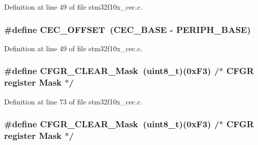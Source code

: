 Definition at line 49 of file stm32f10x\+\_\+cec.\+c.

\subsubsection[{\texorpdfstring{C\+E\+C\+\_\+\+O\+F\+F\+S\+ET}{CEC_OFFSET}}]{\setlength{\rightskip}{0pt plus 5cm}\#define C\+E\+C\+\_\+\+O\+F\+F\+S\+ET~({\bf C\+E\+C\+\_\+\+B\+A\+SE} -\/ {\bf P\+E\+R\+I\+P\+H\+\_\+\+B\+A\+SE})}\hypertarget{group___c_e_c___private___defines_ga675324bd8967b75f32554f50210821af}{}\label{group___c_e_c___private___defines_ga675324bd8967b75f32554f50210821af}


Definition at line 49 of file stm32f10x\+\_\+cec.\+c.

\subsubsection[{\texorpdfstring{C\+F\+G\+R\+\_\+\+C\+L\+E\+A\+R\+\_\+\+Mask}{CFGR_CLEAR_Mask}}]{\setlength{\rightskip}{0pt plus 5cm}\#define C\+F\+G\+R\+\_\+\+C\+L\+E\+A\+R\+\_\+\+Mask~({\bf uint8\+\_\+t})(0x\+F3)        /$\ast$ C\+F\+G\+R register Mask $\ast$/}\hypertarget{group___c_e_c___private___defines_gaaedf9b8df17534f5eaf75ec1ca3fbd7a}{}\label{group___c_e_c___private___defines_gaaedf9b8df17534f5eaf75ec1ca3fbd7a}


Definition at line 73 of file stm32f10x\+\_\+cec.\+c.

\subsubsection[{\texorpdfstring{C\+F\+G\+R\+\_\+\+C\+L\+E\+A\+R\+\_\+\+Mask}{CFGR_CLEAR_Mask}}]{\setlength{\rightskip}{0pt plus 5cm}\#define C\+F\+G\+R\+\_\+\+C\+L\+E\+A\+R\+\_\+\+Mask~({\bf uint8\+\_\+t})(0x\+F3)        /$\ast$ C\+F\+G\+R register Mask $\ast$/}\hypertarget{group___c_e_c___private___defines_gaaedf9b8df17534f5eaf75ec1ca3fbd7a}{}\label{group___c_e_c___private___defines_gaaedf9b8df17534f5eaf75ec1ca3fbd7a}


